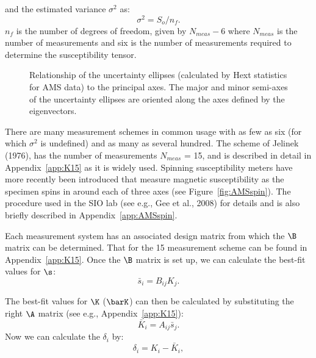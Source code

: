 and the estimated variance $\sigma^2$ as:
\begin{equation}
\sigma^2=S_o/n_f.
\label{eq:s2}
\end{equation}
\noindent $n_f$ is the number of degrees of freedom, given
by $N_{meas}-6$ where $N_{meas}$ is the number of measurements and six is the number of measurements required to determine the susceptibility tensor.  


\begin{figure} [htb]
\epsfysize 3in
\centering {}
\caption
{Relationship of the uncertainty ellipses (calculated by Hext statistics for AMS 
data) to the principal axes. The major and minor semi-axes of the
 uncertainty ellipses are oriented along the axes defined by the
eigenvectors. }
\label{fig:eij}
\end{figure}



There are  many measurement schemes in common usage with as few as six (for which  $\sigma^2$ is undefined)  and as many as several hundred.    The scheme of 
  Jelinek (1976), has the number of measurements $N_{meas}$ = 15, and  is described in detail in Appendix~\ref{app:K15} as it is widely used.   Spinning susceptibility meters have more recently been introduced that measure magnetic susceptibility as the specimen spins in around each of three axes (see Figure~\ref{fig:AMSspin}).   
The procedure used in the SIO lab (see e.g., 
Gee et al., 2008)
 \nocite{gee08} 
for details and is also briefly described in Appendix~\ref{app:AMSspin}.  

Each measurement system has an associated design matrix from which the $\B$ matrix can be determined.  That for the 15 measurement scheme can be found in Appendix~\ref{app:K15}.   Once the $\B$ matrix  is set up,  we can calculate 
the best-fit values for
$\s$:
\begin{equation}
\bar s_i = B_{ij} K_j.
\label{eq:barchi}
\end{equation}

\noindent The best-fit values for $\K$ ($\barK$) 
can then be calculated by substituting the right $\A$ matrix (see e.g., Appendix~\ref{app:K15}): 
$$
\bar K_i = A_{ij}\bar s_j.
$$
\noindent
Now we can calculate the $\delta_i$ by:
\begin{equation}
\delta_i = K_i-\bar K_i,
\label{eq:deli}
\end{equation}

